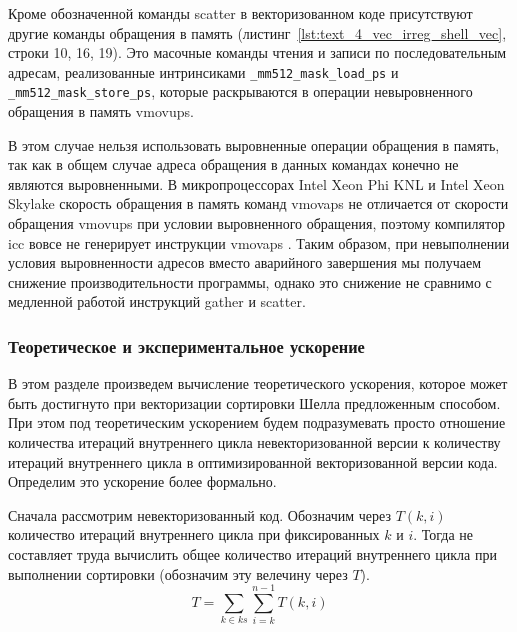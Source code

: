 Кроме обозначенной команды scatter в векторизованном коде присутствуют другие команды обращения в память (листинг~\ref{lst:text_4_vec_irreg_shell_vec}, строки 10, 16, 19).
Это масочные команды чтения и записи по последовательным адресам, реализованные интринсиками \texttt{\_mm512\_mask\_load\_ps} и \texttt{\_mm512\_mask\_store\_ps}, которые раскрываются в операции невыровненного обращения в память vmovups.

В этом случае нельзя использовать выровненные операции обращения в память, так как в общем случае адреса обращения в данных командах конечно не являются выровненными.
В микропроцессорах Intel Xeon Phi KNL\label{abbr:knl13} и Intel Xeon Skylake скорость обращения в память команд vmovaps не отличается от скорости обращения vmovups при условии выровненного обращения, поэтому компилятор icc вовсе не генерирует инструкции vmovaps \cite{MOVUPSintel}.
Таким образом, при невыполнении условия выровненности адресов вместо аварийного завершения мы получаем снижение производительности программы, однако это снижение не сравнимо с медленной работой инструкций gather и scatter.

\subsubsection{Теоретическое и экспериментальное ускорение}

В этом разделе произведем вычисление теоретического ускорения, которое может быть достигнуто при векторизации сортировки Шелла предложенным способом. 
При этом под теоретическим ускорением будем подразумевать просто отношение количества итераций внутреннего цикла невекторизованной версии к количеству итераций внутреннего цикла в оптимизированной векторизованной версии кода.
Определим это ускорение более формально.

Сначала рассмотрим невекторизованный код.
Обозначим через $T(k, i)$ количество итераций внутреннего цикла при фиксированных $k$ и $i$. 
Тогда не составляет труда вычислить общее количество итераций внутреннего цикла при выполнении сортировки (обозначим эту велечину через $T$).
\begin{equation}
	T = \sum_{k \in ks}{\sum_{i = k}^{n - 1}{T(k, i)}}
\end{equation}

